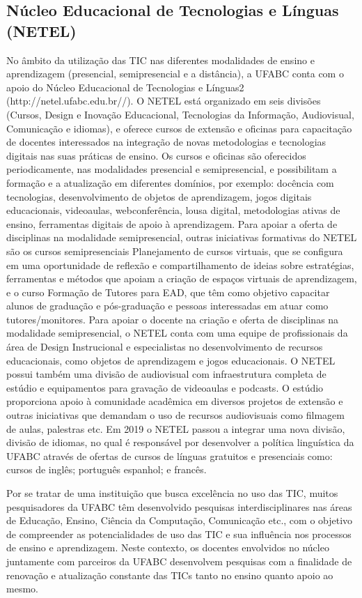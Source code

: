 \documentclass{article}
\begin{document}
\subsection{Núcleo Educacional de Tecnologias e Línguas (NETEL)}
No âmbito da utilização das TIC nas diferentes modalidades de ensino e aprendizagem (presencial, semipresencial e a distância), a UFABC conta com o apoio do Núcleo Educacional de Tecnologias e Línguas2 (http://netel.ufabc.edu.br//). O NETEL está organizado em seis divisões (Cursos, Design e Inovação Educacional, Tecnologias da Informação, Audiovisual, Comunicação e idiomas), e oferece cursos de extensão e oficinas para capacitação de docentes interessados na integração de novas metodologias e tecnologias digitais nas suas práticas de ensino. Os cursos e oficinas são oferecidos periodicamente, nas modalidades presencial e semipresencial, e possibilitam a formação e a atualização em diferentes domínios, por exemplo: docência com tecnologias, desenvolvimento de objetos de aprendizagem, jogos digitais educacionais, videoaulas, webconferência, lousa digital, metodologias ativas de ensino, ferramentas digitais de apoio à aprendizagem. Para apoiar a oferta de disciplinas na modalidade semipresencial, outras iniciativas formativas do NETEL são os cursos semipresenciais Planejamento de cursos virtuais, que se configura em uma oportunidade de reflexão e compartilhamento de ideias sobre estratégias, ferramentas e métodos que apoiam a criação de espaços virtuais de aprendizagem, e o curso Formação de Tutores para EAD, que têm como objetivo capacitar alunos de graduação e pós-graduação e pessoas interessadas em atuar como tutores/monitores. Para apoiar o docente na criação e oferta de disciplinas na modalidade semipresencial, o NETEL conta com uma equipe de profissionais da área de Design Instrucional e especialistas no desenvolvimento de recursos educacionais, como objetos de aprendizagem e jogos educacionais. O NETEL possui também uma divisão de audiovisual com infraestrutura completa de estúdio e equipamentos para gravação de videoaulas e podcasts. O estúdio proporciona apoio à comunidade acadêmica em diversos projetos de extensão e outras iniciativas que demandam o uso de recursos audiovisuais como filmagem de aulas, palestras etc. Em 2019 o NETEL passou a integrar uma nova divisão, divisão de idiomas, no qual é responsável por desenvolver a política linguística da UFABC através de ofertas de cursos de línguas gratuitos e presenciais como: cursos de inglês; português espanhol; e francês.

Por se tratar de uma instituição que busca excelência no uso das TIC, muitos pesquisadores da UFABC têm desenvolvido pesquisas interdisciplinares nas áreas de Educação, Ensino, Ciência da Computação, Comunicação etc., com o objetivo de compreender as potencialidades de uso das TIC e sua influência nos processos de ensino e aprendizagem. Neste contexto, os docentes envolvidos no núcleo juntamente com parceiros da UFABC desenvolvem pesquisas com a finalidade de renovação e atualização constante das TICs tanto no ensino quanto apoio ao mesmo.
\end{document}
